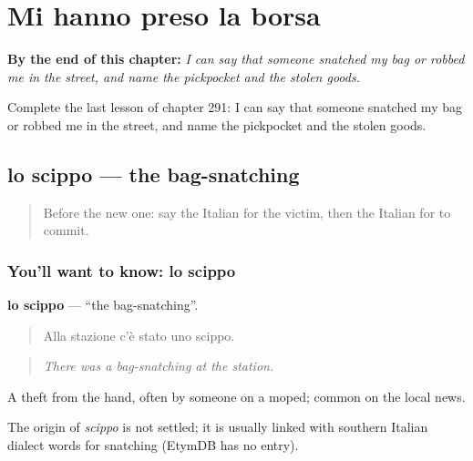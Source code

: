 
\chapter{Mi hanno preso la borsa}
\label{ch:it-mi-hanno-preso-la-borsa}

\begin{chapteropening}
\textbf{By the end of this chapter:} \emph{I can say that someone snatched my bag or robbed me in the street, and name the pickpocket and the stolen goods.}

Complete the last lesson of chapter 291: I can say that someone snatched my bag or robbed me in the street, and name the pickpocket and the stolen goods.
\end{chapteropening}

\section[lo scippo]{lo scippo — the bag-snatching}

\label{lesson:IT-C291-scippo}



\begin{quote}
Before the new one: say the Italian for the victim, then the Italian for to commit.
\end{quote}

\subsection*{You'll want to know: lo scippo}
\textbf{lo scippo} — \textquotedblleft{}the bag-snatching\textquotedblright{}.

\begin{quote}
Alla stazione c'è stato uno scippo.
\end{quote}

\begin{quote}
\emph{There was a bag-snatching at the station.}
\end{quote}

A theft from the hand, often by someone on a moped; common on the local news.

\begin{cousinweb}
The origin of \emph{scippo} is not settled; it is usually linked with southern Italian dialect words for snatching (EtymDB has no entry).
\end{cousinweb}

